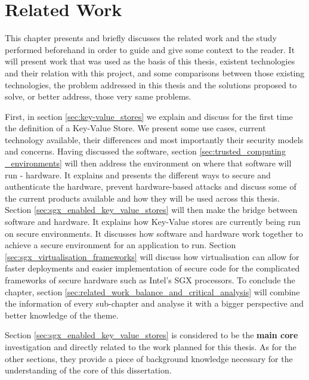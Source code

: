 \chapter{Related Work}
\label{cha:related_work}

This chapter presents and briefly discusses the related work and the study performed beforehand in order to guide and give some context to the reader. It will present work that was used as the basis of this thesis, existent technologies and their relation with this project, and some comparisons between those existing technologies, the problem addressed in this thesis and the solutions proposed to solve, or better address, those very same problems.

First, in section \ref{sec:key-value_stores} we explain and discuss for the first time the definition of a Key-Value Store. We present some use cases, current technology available, their differences and most importantly their security models and concerns.
Having discussed the software, section \ref{sec:trusted_computing _environments} will then address the environment on where that software will run - hardware. It explains and presents the different ways to secure and authenticate the hardware, prevent hardware-based attacks and discuss some of the current products available and how they will be used across this thesis.
Section \ref{sec:sgx_enabled_key_value_stores} will then make the bridge between software and hardware. It explains how Key-Value stores are currently being run on secure environments. It discusses how software and hardware work together to achieve a secure environment for an application to run. Section \ref{sec:sgx_virtualisation_frameworks} will discuss how virtualisation can allow for faster deployments and easier implementation of secure code for the complicated frameworks of secure hardware such as Intel's SGX processors. To conclude the chapter, section \ref{sec:related_work_balance_and_critical_analysis} will combine the information of every sub-chapter and analyse it with a bigger perspective and better knowledge of the theme.

Section \ref{sec:sgx_enabled_key_value_stores} is considered to be the \textbf{main core} investigation and directly related to the work planned for this thesis. As for the other sections, they provide a piece of background knowledge necessary for the understanding of the core of this dissertation.

